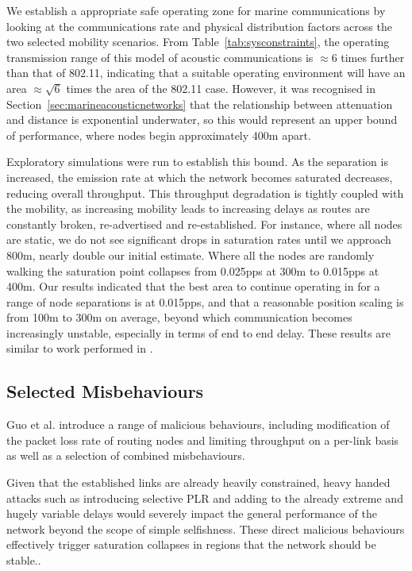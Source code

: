\documentclass[conference]{IEEEtran}
\begin{document}
We establish a appropriate safe operating zone for marine communications by looking at the communications rate and physical distribution factors across the two selected mobility scenarios.
From Table~\ref{tab:sysconstraints}, the operating transmission range of this model of acoustic communications is $\approx 6$ times further than that of 802.11, indicating that a suitable operating environment will have an area $\approx \sqrt{6}$ times the area of the 802.11 case.
However, it was recognised in Section~\ref{sec:marineacousticnetworks} that the relationship between attenuation and distance is exponential underwater, so this would represent an upper bound of performance, where nodes begin approximately 400m apart. 

Exploratory simulations were run to establish this bound.
As the separation is increased, the emission rate at which the network becomes saturated decreases, reducing overall throughput. 
This throughput degradation is tightly coupled with the mobility, as increasing mobility leads to increasing delays as routes are constantly broken, re-advertised and re-established. 
For instance, where all nodes are static, we do not see significant drops in saturation rates until we approach 800m, nearly double our initial estimate. 
Where all the nodes are randomly walking the saturation point collapses from 0.025pps at 300m to 0.015pps at 400m.
Our results indicated that the best area to continue operating in for a range of node separations is at 0.015pps, and that a reasonable position scaling is from 100m to 300m on average, beyond which communication becomes increasingly unstable, especially in terms of end to end delay.
These results are similar to work performed in \cite{Miquel2008}.


\subsection{Selected Misbehaviours}

Guo et al. introduce a range of malicious behaviours, including modification of the packet loss rate of routing nodes and limiting throughput on a per-link basis as well as a selection of combined misbehaviours. 

Given that the established links are already heavily constrained, heavy handed attacks such as introducing selective PLR and adding to the already extreme and hugely variable delays would severely impact the general performance of the network beyond the scope of simple selfishness.
These direct malicious behaviours effectively trigger saturation collapses in regions that the network should be stable..
\end{document}
